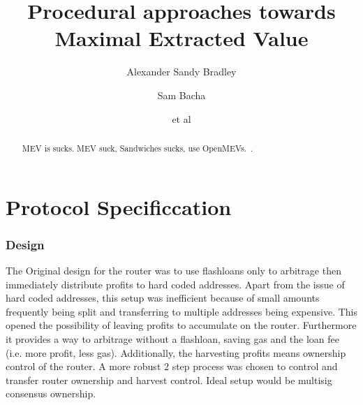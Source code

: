 \documentclass[runningheads]{llncs}
\begin{document}
%
\title{Procedural approaches towards Maximal Extracted Value}
%
\author{Alexander Sandy Bradley \and
Sam Bacha \and
et al}
%
%


%
\maketitle              %


\tableofcontents

\newpage 
\chapter{Protocol Specificcation}
\begin{abstract}
    MEV is sucks. \newline
MEV suck, Sandwiches sucks, use OpenMEVs.~\cite{openmev}.
\end{abstract}

\subsection{Design}
The Original design for the router was to use flashloans only to arbitrage then immediately distribute profits to hard coded addresses. Apart from the issue of hard coded addresses, this setup was inefficient because of small amounts frequently being split and transferring to multiple addresses being expensive. This opened the possibility of leaving profits to accumulate on the router. Furthermore it provides a way to arbitrage without a flashloan, saving gas and the loan fee (i.e. more profit, less gas). Additionally, the harvesting profits means ownership control of the router. A more robust 2 step process was chosen to control and transfer router ownership and harvest control. Ideal setup would be multisig consensus ownership.
\end{document}
